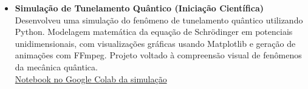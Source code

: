 \documentclass[a4paper,10pt]{article}
\begin{document}
\begin{itemize}[leftmargin=*]
    \item \textbf{Simulação de Tunelamento Quântico (Iniciação Científica)}\\
    Desenvolveu uma simulação do fenômeno de tunelamento quântico utilizando Python. Modelagem matemática da equação de Schrödinger em potenciais unidimensionais, com visualizações gráficas usando Matplotlib e geração de animações com FFmpeg. Projeto voltado à compreensão visual de fenômenos da mecânica quântica.\\
    \href{https://colab.research.google.com/drive/122zQ2S9tb0PJ_tqczK8SwqvF77C_w4Md?usp=sharing}{Notebook no Google Colab da simulação}
\end{itemize}
\end{document}
